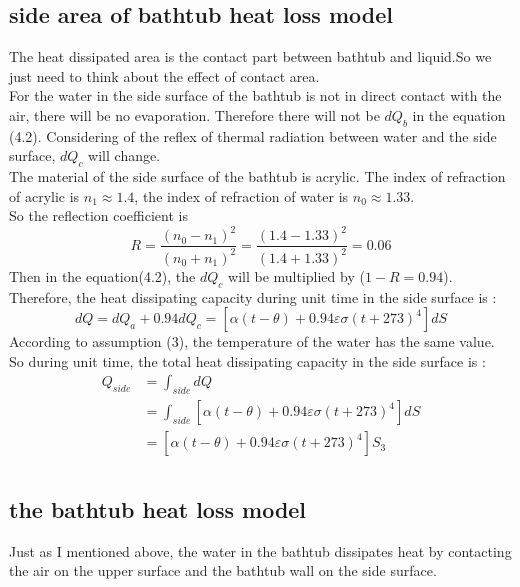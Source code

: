\documentclass{mcmthesis}
\begin{document}
\subsection{side area of bathtub heat loss model} 	%
\indent The heat dissipated area is the contact part between bathtub and liquid.So we just need to think about the effect of contact area. \\ \indent For the water in the side surface of the bathtub is not in direct contact with the air, there will be no evaporation. Therefore there will not be $ dQ_{b} $ in the equation (4.2). Considering of the reflex of thermal radiation between water and the side surface, $dQ_{c}$ will change.\\ \indent The material of the side surface of the bathtub is acrylic. The index of refraction of acrylic is $n_{1}\approx 1.4$, the index of refraction of water is $ n_{0}\approx 1.33 $.\\ \indent So the reflection coefficient is 
\begin{equation}
	 R=\frac{(n_{0}-n_{1})^{2}}{(n_{0}+n_{1})^{2}}=\frac{(1.4-1.33)^{2}}{(1.4+1.33)^2}=0.06 
\end{equation}
\indent Then in the equation(4.2),  the $dQ_{c}$ will be multiplied by ($1-R=0.94$).  Therefore, the heat dissipating capacity during unit time in the side surface is :
\begin{equation}
	dQ=dQ_{a}+0.94dQ_{c}=[\alpha (t-\theta)+0.94\varepsilon \sigma (t+273)^{4}]dS
\end{equation}
\indent According to assumption (3), the temperature of the water has the same value. So during unit time, the total heat dissipating capacity in the side surface is :				%
\begin{equation}
\begin{split}
Q_{side}&=\int_{side}dQ\\
&= \int_{side} [\alpha (t-\theta)+0.94\varepsilon \sigma (t+273)^{4}]dS	\\
&=[\alpha (t-\theta)+0.94\varepsilon \sigma (t+273)^{4}]S_{3}\\
\end{split}
\end{equation}
\subsection{the bathtub heat loss model} 	%

\indent Just as I mentioned above, the water in the bathtub dissipates heat by contacting the air on the upper surface and the bathtub wall on the side surface. \\
\end{document}
